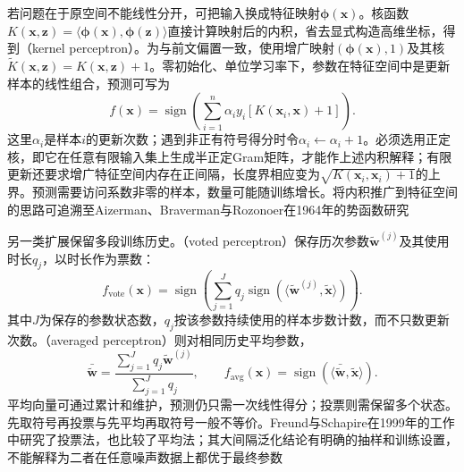 若问题在于原空间不能线性分开，可把输入换成特征映射$\bm{\phi}(\bm{x})$。核函数$K(\bm{x},\bm{z})=\langle\bm{\phi}(\bm{x}),\bm{\phi}(\bm{z})\rangle$直接计算映射后的内积，省去显式构造高维坐标，得到（kernel perceptron）。为与前文偏置一致，使用增广映射$(\bm{\phi}(\bm{x}),1)$及其核$\tilde K(\bm{x},\bm{z})=K(\bm{x},\bm{z})+1$。零初始化、单位学习率下，参数在特征空间中是更新样本的线性组合，预测可写为
\begin{equation}
  \label{eq:classification-kernel-perceptron}
  f(\bm{x})=\operatorname{sign}
    \left(\sum_{i=1}^{n}\alpha_i y_i
      [K(\bm{x}_i,\bm{x})+1]\right).
\end{equation}
这里$\alpha_i$是样本$i$的更新次数；遇到非正有符号得分时令$\alpha_i\leftarrow\alpha_i+1$。必须选用正定核，即它在任意有限输入集上生成半正定Gram矩阵，才能作上述内积解释；有限更新还要求增广特征空间内存在正间隔，长度界相应变为$\sqrt{K(\bm{x}_i,\bm{x}_i)+1}$的上界。预测需要访问系数非零的样本，数量可能随训练增长。将内积推广到特征空间的思路可追溯至Aizerman、Braverman与Rozonoer在1964年的势函数研究

另一类扩展保留多段训练历史。（voted perceptron）保存历次参数$\tilde{\bm{w}}^{(j)}$及其使用时长$q_j$，以时长作为票数：
\[
  f_{\mathrm{vote}}(\bm{x})
    =\operatorname{sign}\left(
      \sum_{j=1}^{J}q_j
        \operatorname{sign}
          (\langle\tilde{\bm{w}}^{(j)},\tilde{\bm{x}}\rangle)
      \right).
\]
其中$J$为保存的参数状态数，$q_j$按该参数持续使用的样本步数计数，而不只数更新次数。（averaged perceptron）则对相同历史平均参数，
\[
  \bar{\tilde{\bm{w}}}
    =\frac{\sum_{j=1}^{J}q_j\tilde{\bm{w}}^{(j)}}
      {\sum_{j=1}^{J}q_j},
  \qquad
  f_{\mathrm{avg}}(\bm{x})
    =\operatorname{sign}
       (\langle\bar{\tilde{\bm{w}}},\tilde{\bm{x}}\rangle).
\]
平均向量可通过累计和维护，预测仍只需一次线性得分；投票则需保留多个状态。先取符号再投票与先平均再取符号一般不等价。Freund与Schapire在1999年的工作中研究了投票法，也比较了平均法；其大间隔泛化结论有明确的抽样和训练设置，不能解释为二者在任意噪声数据上都优于最终参数

